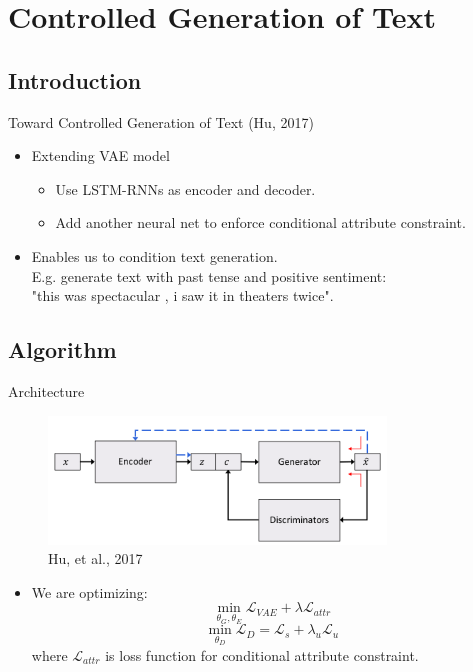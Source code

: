 \documentclass{beamer}
\begin{document}
    \section{Controlled Generation of Text}

    \subsection{Introduction}

    \begin{frame}{Toward Controlled Generation of Text (Hu, 2017)}

        \begin{itemize}
            \item Extending VAE model
            \begin{itemize}
                \item Use LSTM-RNNs as encoder and decoder.
                \item Add another neural net to enforce conditional attribute constraint.
            \end{itemize}
            \item Enables us to condition text generation. \\E.g. generate text with past tense and positive sentiment: \\"this was spectacular , i saw it in theaters twice".
        \end{itemize}

    \end{frame}

    \subsection{Algorithm}

    \begin{frame}{Architecture}
        \begin{figure}
            \includegraphics[width=0.8\textwidth]{architecture}
            \caption{\label{fig:arch}Hu, et al., 2017}
        \end{figure}

        \begin{itemize}
            \item We are optimizing:
            $$\min_{\theta_G, \theta_E} \mathcal{L}_{VAE} + \lambda \mathcal{L}_{attr}$$
            $$\min_{\theta_{D}} \mathcal{L}_D = \mathcal{L}_s + \lambda_u \mathcal{L}_u $$
            where $\mathcal{L}_{attr}$ is loss function for conditional attribute constraint.
        \end{itemize}
    \end{frame}
\end{document}
